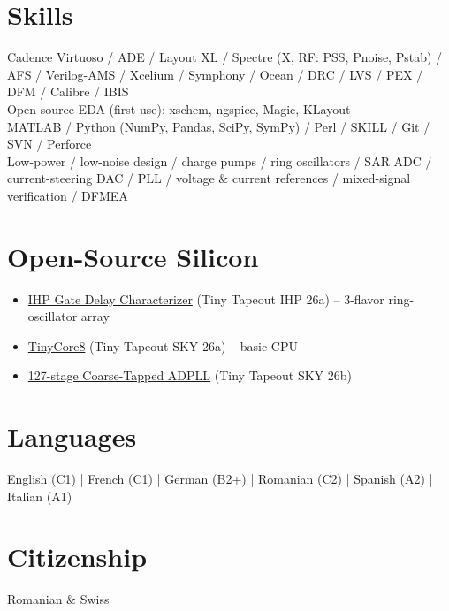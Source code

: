 \documentclass[11pt,a4paper]{article}
\begin{document}
	\section*{Skills}
	Cadence Virtuoso / ADE / Layout XL / Spectre (X, RF: PSS, Pnoise, Pstab) / AFS / Verilog-AMS / Xcelium / Symphony / Ocean / DRC / LVS / PEX / DFM / Calibre / IBIS \\
	Open-source EDA (first use): xschem, ngspice, Magic, KLayout \\
	MATLAB / Python (NumPy, Pandas, SciPy, SymPy) / Perl / SKILL / Git / SVN / Perforce \\
	Low-power / low-noise design / charge pumps / ring oscillators / SAR ADC / current-steering DAC / PLL / voltage \& current references / mixed-signal verification / DFMEA
	
	\section*{Open-Source Silicon}
	\begin{itemize}
		\item \href{https://tinytapeout.com/chips/ttihp26a/tt_um_catalinlazar_ihp_osc_array}{IHP Gate Delay Characterizer} (Tiny Tapeout IHP 26a) -- 3-flavor ring-oscillator array
		\item \href{https://tinytapeout.com/chips/ttsky26a/tt_um_catalinlazar_tinycore8}{TinyCore8} (Tiny Tapeout SKY 26a) -- basic CPU
		\item \href{https://tinytapeout.com/chips/ttsky26b/tt_um_catalinlazar_adpll_125m_sky130}{127-stage Coarse-Tapped ADPLL} (Tiny Tapeout SKY 26b)
	\end{itemize}
	
	\section*{Languages}
	English (C1) | French (C1) | German (B2+) | Romanian (C2) | Spanish (A2) | Italian (A1)
	
	\section*{Citizenship}
	Romanian \& Swiss
	
	
\end{document}
